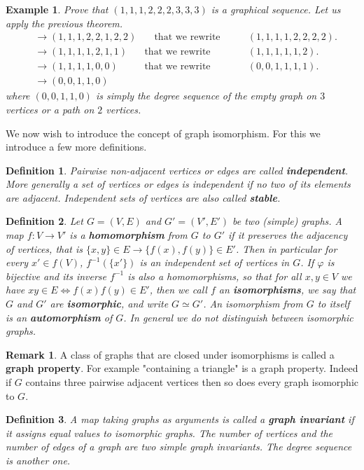 \documentclass[12pt,a4paper]{article}
\newtheorem{defn}{Definition}[section]
\newtheorem{exmp}{Example}[section]
\theoremstyle{definition}
\newtheorem{rem}{Remark}[section]
\begin{document}
\begin{exmp} Prove that $(1,1,1,2,2,2,3,3,3)$ is a graphical sequence. Let us apply the previous theorem. 
\begin{align*}
&\rightarrow (1,1,1,2,2,1,2,2)  & \quad \text{that we rewrite}   & \qquad (1,1,1,1,2,2,2,2). \\
&\rightarrow (1,1,1,1,2,1,1)  & \text{that we rewrite}  & \qquad (1,1,1,1,1,2). \\
& \rightarrow (1,1,1,1,0,0) & \text{that we rewrite} & \qquad (0,0,1,1,1,1). \\
 & \rightarrow (0,0,1,1,0) 
\end{align*}
where $(0,0,1,1,0)$ is simply the degree sequence of the empty graph on $3$ vertices or a path on $2$ vertices.
\end{exmp}
We now wish to introduce the concept of graph isomorphism. For this we introduce a few more definitions. 
\begin{defn} Pairwise non-adjacent vertices or edges are called \textbf{independent}. More generally a set of vertices or edges is independent if no two of its elements are adjacent. Independent sets of vertices are also called \textbf{stable}.
\end{defn}
\begin{defn} Let $G=(V,E)$ and $G'=(V',E')$ be two (simple) graphs. A map $f : V \to V'$ is a \textbf{homomorphism} from $G$ to $G'$ if it preserves the adjacency of vertices, that is $\{x,y\} \in E \to \{ f(x), f(y)\} \in E'$. Then in particular for every $x' \in f(V)$, $f^{-1}( \{x'\})$ is an independent set of vertices in $G$. If $\varphi$ is bijective and its inverse $f^{-1}$ is also a homomorphisms, so that for all $x,y \in V$ we have $xy \in E \iff f(x) f(y) \in E'$, then we call $f$ an \textbf{isomorphisms}, we say that $G$ and $G'$ are \textbf{isomorphic}, and write $G \simeq G'$. An isomorphism from $G$ to itself is an \textbf{automorphism} of $G$. In general we do not distinguish between isomorphic graphs. 
\end{defn}
\begin{rem} A class of graphs that are closed under isomorphisms is called a \textbf{graph property}. For example "containing a triangle" is a graph property. Indeed if $G$ contains three pairwise adjacent vertices then so does every graph isomorphic to $G$.
\end{rem}
\begin{defn} A map taking graphs as arguments is called a \textbf{graph invariant} if it assigns equal values to isomorphic graphs. The number of vertices and the number of edges of a graph are two simple graph invariants. The degree sequence is another one. 
\end{defn}
\end{document}
